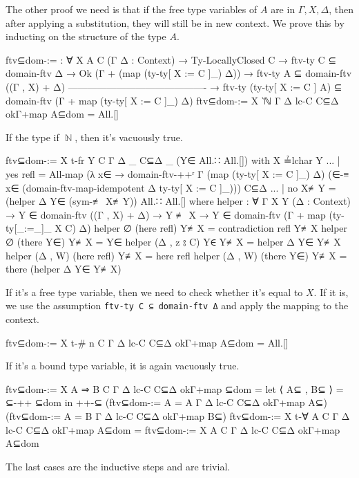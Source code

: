 \documentclass[logo,bsc,singlespacing,parskip,online]{infthesis}
\DeclareMathOperator{\nat}{\mathbb{N}}
\begin{document}
The other proof we need is that if the free type variables of $A$ are in $\Gamma, X, \Delta$, then
after applying a substitution, they will still be in new context. We prove this by inducting on the
structure of the type $A$.
\begin{code}
  ftv⊆dom-:= : ∀ {X A C} (Γ Δ : Context)
     → Ty-LocallyClosed C
     → ftv-ty C ⊆ domain-ftv Δ
     → Ok (Γ + (map (ty-ty[ X := C ]_) Δ))
     → ftv-ty A ⊆ domain-ftv ((Γ , X) + Δ)
       -------------------------------------------
     → ftv-ty (ty-ty[ X := C ] A)
       ⊆ domain-ftv (Γ + map (ty-ty[ X := C ]_) Δ)
  ftv⊆dom-:= {X} {‵ℕ} Γ Δ lc-C C⊆Δ okΓ+map A⊆dom = All.[]
\end{code}
If the type if $\nat$, then it's vacuously true.
\begin{code}
  ftv⊆dom-:= {X} {t-fr Y} {C} Γ Δ _ C⊆Δ _ (Y∈ All.∷ All.[])
    with X ≟lchar Y
  ... | yes refl = All-map
    (λ x∈ → domain-ftv-++ʳ Γ (map (ty-ty[ X := C ]_) Δ)
      (∈-≡ x∈ (domain-ftv-map-idempotent {Δ} {ty-ty[ X := C ]_})))
    C⊆Δ
  ... | no  X≢Y  = (helper Δ Y∈ (sym-≢ X≢Y)) All.∷ All.[]
    where
      helper : ∀ {Γ X Y} (Δ : Context)
        → Y ∈ domain-ftv ((Γ , X) + Δ)
        → Y ≢ X
        → Y ∈ domain-ftv (Γ + map (ty-ty[_:=_]_ X C) Δ)
      helper ∅ (here refl) Y≢X = contradiction refl Y≢X
      helper ∅ (there Y∈) Y≢X = Y∈
      helper (Δ , z ⦂ C) Y∈ Y≢X = helper Δ Y∈ Y≢X
      helper (Δ , W) (here refl) Y≢X = here refl
      helper (Δ , W) (there Y∈) Y≢X = there (helper Δ Y∈ Y≢X)
\end{code}
If it's a free type variable, then we need to check whether it's equal to $X$. If it is, we use the
assumption \texttt{ftv-ty C ⊆ domain-ftv Δ} and apply the mapping to the context.
\begin{code}
  ftv⊆dom-:= {X} {t-# n} {C} Γ Δ lc-C C⊆Δ okΓ+map A⊆dom = All.[]
\end{code}
If it's a bound type variable, it is again vacuously true.
\begin{code}
  ftv⊆dom-:= {X} {A ⇒ B} {C} Γ Δ lc-C C⊆Δ okΓ+map ⊆dom =
    let ⟨ A⊆ , B⊆ ⟩ = ⊆-++ ⊆dom
    in ++-⊆
      (ftv⊆dom-:= {A = A} Γ Δ lc-C C⊆Δ okΓ+map A⊆)
      (ftv⊆dom-:= {A = B} Γ Δ lc-C C⊆Δ okΓ+map B⊆)
  ftv⊆dom-:= {X} {t-∀ A} {C} Γ Δ lc-C C⊆Δ okΓ+map A⊆dom =
    ftv⊆dom-:= {X} {A} {C} Γ Δ lc-C C⊆Δ okΓ+map A⊆dom
\end{code}
The last cases are the inductive steps and are trivial.
\end{document}
